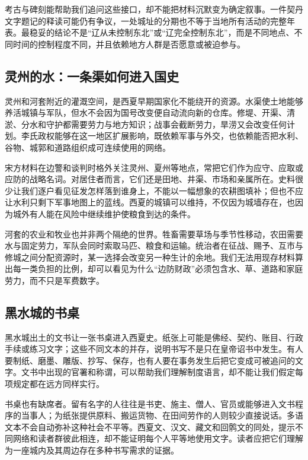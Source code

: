 考古与碑刻能帮助我们追问这些接口，却不能把材料沉默变为确定叙事。一件契丹文字题记的释读可能仍有争议，一处城址的分期也不等于当地所有活动的完整年表。最稳妥的结论不是“辽从未控制东北”或“辽完全控制东北”，而是不同地点、不同时间的控制程度不同，并且依赖地方人群是否愿意或被迫参与。

\subsection{灵州的水：一条渠如何进入国史}

灵州和河套附近的灌溉空间，是西夏早期国家化不能绕开的资源。水渠使土地能够养活城镇与军队，但水不会因为国号改变便自动流向新的仓库。修堤、开渠、清淤、分水和守护都需要劳力与地方知识；战事会截断劳力，旱涝又会改变任何计划。李氏政权能够在这一地区扩展影响，既依赖军事与外交，也依赖能否把水利、谷物、城郭和道路组织成可连续使用的网络。

宋方材料在边警和谈判时格外关注灵州、夏州等地点，常把它们作为应守、应取或应防的战略名词。对居住者而言，它们还是田地、井渠、市场和亲属所在。史料很少让我们逐户看见征发怎样落到谁身上，不能以一幅想象的农耕图填补；但也不应让水利只剩下军事地图上的蓝线。西夏的城镇可以维持，不仅因为城墙存在，也因为城外有人能在风险中继续维护使粮食到达的条件。

河套的农业和牧业也并非两个隔绝的世界。牲畜需要草场与季节性移动，农田需要水与固定劳力，军队会同时索取马匹、粮食和运输。统治者在征战、赐予、互市与修城之间分配资源时，某一选择会改变另一种生计的余地。我们无法用现存材料算出每一类负担的比例，却可以看见为什么“边防财政”必须包含水、草、道路和家庭劳力，而不只是军费数字。

\subsection{黑水城的书桌}

黑水城出土的文书让一张书桌进入西夏史。纸张上可能是佛经、契约、账目、行政手续或练习文字；这些不同文本的并存，说明书写不是只在皇帝诏书中发生。有人要制纸、磨墨、雕版、抄写、保存，也有人要在事务发生后把它变成可被追问的文字。文书中出现的官署和称谓，可以帮助我们理解制度语言，却不能让我们假定每项规定都在远方同样实行。

书桌也有缺席者。留有名字的人往往是书吏、施主、僧人、官员或能够进入文书程序的当事人；为纸张提供原料、搬运货物、在田间劳作的人则较少直接说话。多语文本不会自动弥补这种社会不平等。西夏文、汉文、藏文和回鹘文的同处，提示不同网络和读者群彼此相连，却不能证明每个人平等地使用文字。读者应把它们理解为一座城内及其周边存在多种书写需求的证据。

